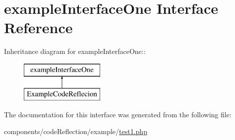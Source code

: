 \hypertarget{interfaceexample_interface_one}{
\section{exampleInterfaceOne Interface Reference}
\label{interfaceexample_interface_one}
}
Inheritance diagram for exampleInterfaceOne::\begin{figure}[H]
\begin{center}
\leavevmode
\includegraphics[height=2cm]{interfaceexample_interface_one}
\end{center}
\end{figure}


The documentation for this interface was generated from the following file:\begin{CompactItemize}
\item 
components/codeReflection/example/\hyperlink{code_reflection_2example_2test1_8php}{test1.php}\end{CompactItemize}
